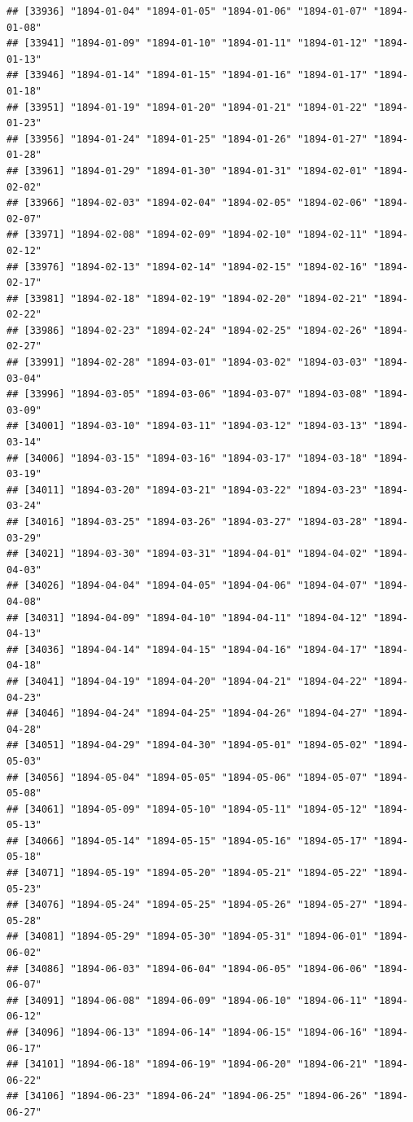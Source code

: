 \documentclass{article}\usepackage[]{graphicx}\usepackage[]{color}
\makeatletter
\newenvironment{kframe}{%
 \def\at@end@of@kframe{}%
 \ifinner\ifhmode%
  \def\at@end@of@kframe{\end{minipage}}%
  \begin{minipage}{\columnwidth}%
 \fi\fi%
 \def\FrameCommand##1{\hskip\@totalleftmargin \hskip-\fboxsep
 \colorbox{shadecolor}{##1}\hskip-\fboxsep
     \hskip-\linewidth \hskip-\@totalleftmargin \hskip\columnwidth}%
 \MakeFramed {\advance\hsize-\width
   \@totalleftmargin\z@ \linewidth\hsize
   \@setminipage}}%
 {\par\unskip\endMakeFramed%
 \at@end@of@kframe}
\newenvironment{knitrout}{}{} %
\makeatother
\begin{document}
\begin{description}
\begin{knitrout}
\begin{kframe}
\begin{verbatim}
## [33936] "1894-01-04" "1894-01-05" "1894-01-06" "1894-01-07" "1894-01-08"
## [33941] "1894-01-09" "1894-01-10" "1894-01-11" "1894-01-12" "1894-01-13"
## [33946] "1894-01-14" "1894-01-15" "1894-01-16" "1894-01-17" "1894-01-18"
## [33951] "1894-01-19" "1894-01-20" "1894-01-21" "1894-01-22" "1894-01-23"
## [33956] "1894-01-24" "1894-01-25" "1894-01-26" "1894-01-27" "1894-01-28"
## [33961] "1894-01-29" "1894-01-30" "1894-01-31" "1894-02-01" "1894-02-02"
## [33966] "1894-02-03" "1894-02-04" "1894-02-05" "1894-02-06" "1894-02-07"
## [33971] "1894-02-08" "1894-02-09" "1894-02-10" "1894-02-11" "1894-02-12"
## [33976] "1894-02-13" "1894-02-14" "1894-02-15" "1894-02-16" "1894-02-17"
## [33981] "1894-02-18" "1894-02-19" "1894-02-20" "1894-02-21" "1894-02-22"
## [33986] "1894-02-23" "1894-02-24" "1894-02-25" "1894-02-26" "1894-02-27"
## [33991] "1894-02-28" "1894-03-01" "1894-03-02" "1894-03-03" "1894-03-04"
## [33996] "1894-03-05" "1894-03-06" "1894-03-07" "1894-03-08" "1894-03-09"
## [34001] "1894-03-10" "1894-03-11" "1894-03-12" "1894-03-13" "1894-03-14"
## [34006] "1894-03-15" "1894-03-16" "1894-03-17" "1894-03-18" "1894-03-19"
## [34011] "1894-03-20" "1894-03-21" "1894-03-22" "1894-03-23" "1894-03-24"
## [34016] "1894-03-25" "1894-03-26" "1894-03-27" "1894-03-28" "1894-03-29"
## [34021] "1894-03-30" "1894-03-31" "1894-04-01" "1894-04-02" "1894-04-03"
## [34026] "1894-04-04" "1894-04-05" "1894-04-06" "1894-04-07" "1894-04-08"
## [34031] "1894-04-09" "1894-04-10" "1894-04-11" "1894-04-12" "1894-04-13"
## [34036] "1894-04-14" "1894-04-15" "1894-04-16" "1894-04-17" "1894-04-18"
## [34041] "1894-04-19" "1894-04-20" "1894-04-21" "1894-04-22" "1894-04-23"
## [34046] "1894-04-24" "1894-04-25" "1894-04-26" "1894-04-27" "1894-04-28"
## [34051] "1894-04-29" "1894-04-30" "1894-05-01" "1894-05-02" "1894-05-03"
## [34056] "1894-05-04" "1894-05-05" "1894-05-06" "1894-05-07" "1894-05-08"
## [34061] "1894-05-09" "1894-05-10" "1894-05-11" "1894-05-12" "1894-05-13"
## [34066] "1894-05-14" "1894-05-15" "1894-05-16" "1894-05-17" "1894-05-18"
## [34071] "1894-05-19" "1894-05-20" "1894-05-21" "1894-05-22" "1894-05-23"
## [34076] "1894-05-24" "1894-05-25" "1894-05-26" "1894-05-27" "1894-05-28"
## [34081] "1894-05-29" "1894-05-30" "1894-05-31" "1894-06-01" "1894-06-02"
## [34086] "1894-06-03" "1894-06-04" "1894-06-05" "1894-06-06" "1894-06-07"
## [34091] "1894-06-08" "1894-06-09" "1894-06-10" "1894-06-11" "1894-06-12"
## [34096] "1894-06-13" "1894-06-14" "1894-06-15" "1894-06-16" "1894-06-17"
## [34101] "1894-06-18" "1894-06-19" "1894-06-20" "1894-06-21" "1894-06-22"
## [34106] "1894-06-23" "1894-06-24" "1894-06-25" "1894-06-26" "1894-06-27"

\end{verbatim}
\end{kframe}
\end{knitrout}
\end{description}
\end{document}
